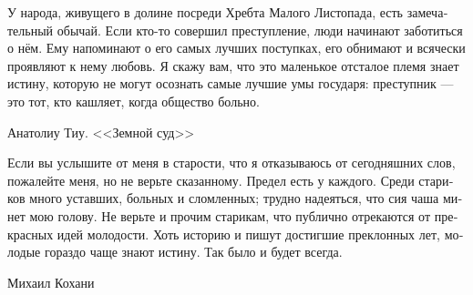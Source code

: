 \documentclass[a4paper,12pt,fleqn]{book}\usepackage{cooltooltips}\usepackage{polyglossia}\setdefaultlanguage[babelshorthands=true]{russian}\setotherlanguage{english}\defaultfontfeatures{Ligatures=TeX,Mapping=tex-text} \usepackage{xcolor}\definecolor{lightgray}{HTML}{bbbbbb}\color{lightgray}\newcommand{\ml}[3]{\textenglish{\textcolor{black}{#3}}}
\begin{document}
{\epigraph
{У народа, живущего в долине посреди Хребта Малого Листопада, есть замечательный обычай.
Если кто-то совершил преступление, люди начинают заботиться о нём.
Ему напоминают о его самых лучших поступках, его обнимают и всячески проявляют к нему любовь.
Я скажу вам, что это маленькое отсталое племя знает истину, которую не могут осознать самые лучшие умы государя: преступник --- это тот, кто кашляет, когда общество больно.}
{Анатолиу Тиу.
<<Земной суд>>}

\epigraph
{Если вы услышите от меня в старости, что я отказываюсь от сегодняшних слов, пожалейте меня, но не верьте сказанному.
Предел есть у каждого.
Среди стариков много уставших, больных и сломленных;
трудно надеяться, что сия чаша минет мою голову.
Не верьте и прочим старикам, что публично отрекаются от прекрасных идей молодости.
Хоть историю и пишут достигшие преклонных лет, молодые гораздо чаще знают истину.
Так было и будет всегда.}
{Михаил Кохани}

}
\end{document}
